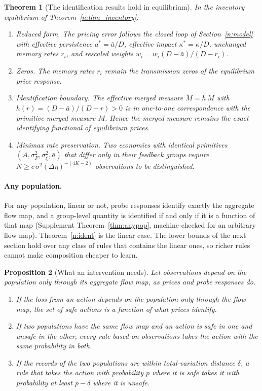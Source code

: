\documentclass[12pt]{article}
\newtheorem{theorem}{Theorem}[section]
\newtheorem{proposition}[theorem]{Proposition}
\theoremstyle{definition}
\theoremstyle{remark}
\begin{document}
\begin{theorem}[The identification results hold in equilibrium]\label{n:thm_eqreduced}
In the inventory equilibrium of Theorem~\ref{n:thm_inventory}:
\begin{enumerate}[label=(\roman*),itemsep=1pt]
\item \emph{Reduced form.} The pricing error follows the closed loop of Section~\ref{n:model} with effective persistence $a^*=\bar a/D$, effective impact $\kappa^*=\kappa/D$, unchanged memory rates $r_i$, and rescaled weights $\tilde w_i=w_i(D-\bar a)/(D-r_i)$.
\item \emph{Zeros.} The memory rates $r_i$ remain the transmission zeros of the equilibrium price response.
\item \emph{Identification boundary.} The effective merged measure $\tilde M=h\,M$ with $h(r)=(D-\bar a)/(D-r)>0$ is in one-to-one correspondence with the primitive merged measure $M$. Hence the merged measure remains the exact identifying functional of equilibrium prices.
\item \emph{Minimax rate preservation.} Two economies with identical primitives $(A,\sigma_F^2,\sigma_\xi^2,\bar a)$ that differ only in their feedback groups require $N\ge c\,\sigma^2(\Delta\eta)^{-(4K-2)}$ observations to be distinguished.
\end{enumerate}
\end{theorem}


\paragraph{Any population.} For any population, linear or not, probe responses identify exactly the aggregate flow map, and a group-level quantity is identified if and only if it is a function of that map (Supplement Theorem~\ref{thm:anypop}, machine-checked for an arbitrary flow map). Theorem~\ref{n:ident} is the linear case. The lower bounds of the next section hold over any class of rules that contains the linear ones, so richer rules cannot make composition cheaper to learn.

\begin{proposition}[What an intervention needs]\label{n:interv}
Let observations depend on the population only through its aggregate flow map, as prices and probe responses do.
\begin{enumerate}[label=(\roman*),itemsep=1pt]
\item If the loss from an action depends on the population only through the flow map, the set of safe actions is a function of what prices identify.
\item If two populations have the same flow map and an action is safe in one and unsafe in the other, every rule based on observations takes the action with the same probability in both.
\item If the records of the two populations are within total-variation distance $\delta$, a rule that takes the action with probability $p$ where it is safe takes it with probability at least $p-\delta$ where it is unsafe.
\end{enumerate}
\end{proposition}
\end{document}
